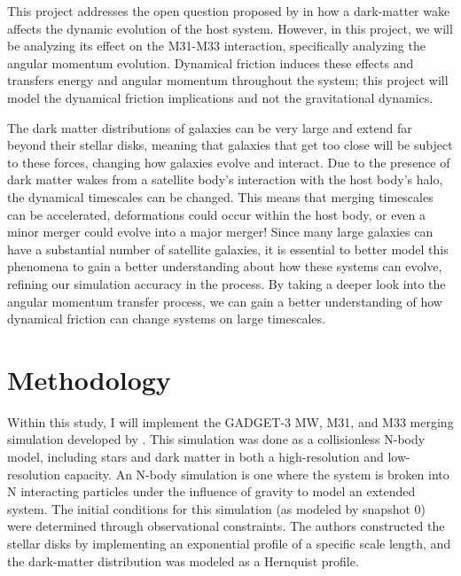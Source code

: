 \documentclass[fleqn,usenatbib]{mnras}
\begin{document}
\vspace{10pt}

This project addresses the open question proposed by \citep{Garavito-Camargo_2019} in how a dark-matter wake affects the dynamic evolution of the host system. However, in this project, we will be analyzing its effect on the M31-M33 interaction, specifically analyzing the angular momentum evolution. Dynamical friction induces these effects and transfers energy and angular momentum throughout the system; this project will model the dynamical friction implications and not the gravitational dynamics. 

\vspace{10pt}

The dark matter distributions of galaxies can be very large and extend far beyond their stellar disks, meaning that galaxies that get too close will be subject to these forces, changing how galaxies evolve and interact. Due to the presence of dark matter wakes from a satellite body's interaction with the host body's halo, the dynamical timescales can be changed. This means that merging timescales can be accelerated, deformations could occur within the host body, or even a minor merger could evolve into a major merger! Since many large galaxies can have a substantial number of satellite galaxies, it is essential to better model this phenomena to gain a better understanding about how these systems can evolve, refining our simulation accuracy in the process. By taking a deeper look into the angular momentum transfer process, we can gain a better understanding of how dynamical friction can change systems on large timescales. 



\section{Methodology}  %

Within this study, I will implement the GADGET-3 MW, M31, and M33 merging simulation developed by \cite{vandermarel2012}. This simulation was done as a collisionless N-body model, including stars and dark matter in both a high-resolution and low-resolution capacity. An N-body simulation is one where the system is broken into N interacting particles under the influence of gravity to model an extended system. The initial conditions for this simulation (as modeled by snapshot 0) were determined through observational constraints. The authors constructed the stellar disks by implementing an exponential profile of a specific scale length, and the dark-matter distribution was modeled as a Hernquist profile. 
\end{document}

